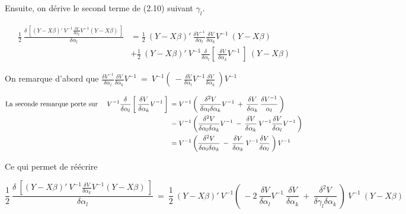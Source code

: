 \documentclass[12pt,fleqn]{book} %
\begin{document}
\vspace{1em}

Ensuite, on dérive le second terme de (2.10) suivant $\gamma_l$.

\begin{align*}
\frac{1}{2} \:  \frac{\delta\:\left[ (Y-X\beta)' \:V^{-1} \frac{ \delta V }{\delta \alpha_k} V^{-1} (Y-X\beta)\: \right]  }{\delta \alpha_l} &= \frac{1}{2} \: (Y-X\beta)'\:  \frac{ \delta V^{-1} }{\delta \alpha_l} \frac{ \delta V }{\delta \alpha_k} V^{-1}\:(Y-X\beta)\\
	&+ \frac{1}{2} \: (Y-X\beta)'\:V^{-1} \frac{\delta}{\delta \alpha_l}\left[\:\frac{ \delta V }{\delta \alpha_k} V^{-1}\:\right]\:(Y-X\beta)
\end{align*}

\vspace{1em}

On remarque d'abord que \quad $\frac{ \delta V^{-1} }{\delta \alpha_l} \frac{ \delta V }{\delta \alpha_k} V^{-1}\:=\:
 V^{-1}  \left(\: - \frac{ \delta V }{\delta \alpha_l} V^{-1} \frac{ \delta V }{\delta \alpha_k}  \:\right) V^{-1}$

\vspace{1em}

\begin{align*}
\textnormal{La seconde remarque porte sur } \quad V^{-1}\frac{\delta}{\delta \alpha_l}\left[\:\frac{ \delta V }{\delta \alpha_k} V^{-1}\:\right] \:&= V^{-1}\left(\: \frac{ \delta^2 V }{\delta \alpha_l \delta \alpha_k} V^{-1} \:+\:  \frac{ \delta V }{\delta \alpha_k} \:  \frac{\delta V^{-1}}{\alpha_l}\:\right)\\
	&=V^{-1}\left(\frac{ \delta^2 V }{\delta \alpha_l \delta \alpha_k} V^{-1} \:-\:  \frac{ \delta V }{\delta \alpha_k} \:  V^{-1} \frac{ \delta V }{\delta \alpha_l} V^{-1}\:\right) \\
    &=V^{-1}\left(\frac{ \delta^2 V }{\delta \alpha_l \delta \alpha_k} \:-\:  \frac{ \delta V }{\delta \alpha_k} \:  V^{-1} \frac{ \delta V }{\delta \alpha_l} \:\right) V^{-1} \\
\end{align*}

Ce qui permet de réécrire 


\begin{equation*}
\frac{1}{2} \:  \frac{\delta\:\left[ (Y-X\beta)' \:V^{-1} \frac{ \delta V }{\delta \alpha_k} V^{-1} (Y-X\beta)\: \right]  }{\delta \alpha_l} \:=\: \frac{1}{2} \: (Y-X\beta)'\:V^{-1} \left(\: -2\: \frac{ \delta V }{\delta \alpha_l} V^{-1}\:  \frac{ \delta V }{\delta \alpha_k} \:+\: \frac{ \delta^2 V }{\delta \gamma_l \delta \alpha_k} \:\right)\: V^{-1}\:(Y-X\beta)
\end{equation*}
\end{document}
